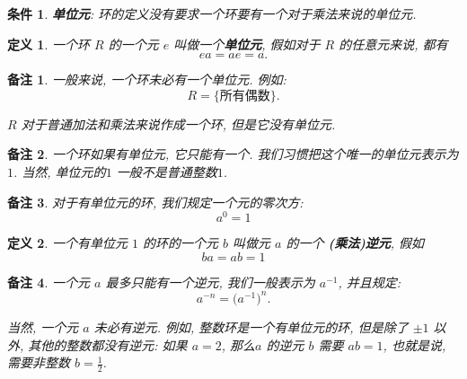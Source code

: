 \documentclass[utf8]{ctexbook}
\newtheorem{definition}{定义}[section]
\newtheorem{memo}{备注}[section]
\newtheorem{condition}{条件}[section]
\begin{document}
\begin{condition}
\textbf{单位元}: 环的定义没有要求一个环要有一个对于乘法来说的单位元.
\end{condition}

\begin{definition}
一个环 $R$ 的一个元 $e$ 叫做一个\textbf{单位元}, 假如对于 $R$ 的任意元来说, 都有
\begin{equation}
e a = a e = a .
\end{equation}
\end{definition}

\begin{memo}
一般来说, 一个环未必有一个单位元. 例如:
\begin{equation}
R = \{ \mbox{所有偶数} \} .
\end{equation}

$R$ 对于普通加法和乘法来说作成一个环, 但是它没有单位元.

\end{memo}

\begin{memo}
一个环如果有单位元, 它只能有一个. 我们习惯把这个唯一的单位元表示为 $1$. 当然, 单位元的$1$ 一般不是普通整数$1$. 
\end{memo}

\begin{memo}
对于有单位元的环, 我们规定一个元的零次方:
\begin{equation}
a^0 = 1
\end{equation}

\end{memo}

\begin{definition}
一个有单位元 $1$ 的环的一个元 $b$ 叫做元 $a$ 的一个 \textbf{(乘法)逆元}, 假如
\begin{equation}
b a = a b = 1
\end{equation} 
\end{definition}

\begin{memo}
一个元 $a$ 最多只能有一个逆元, 我们一般表示为 $a^{-1}$, 并且规定:
\begin{equation}
a^{-n} = \big( a^{-1} \big)^n .
\end{equation}


当然, 一个元 $a$ 未必有逆元. 例如, 整数环是一个有单位元的环, 但是除了 $\pm 1$ 以外, 其他的整数都没有逆元: 如果 $a=2$, 那么$a$ 的逆元 $b$ 需要 $a b = 1$, 也就是说, 需要非整数 $b = \frac{1}{2}$. 
\end{memo}
\end{document}
